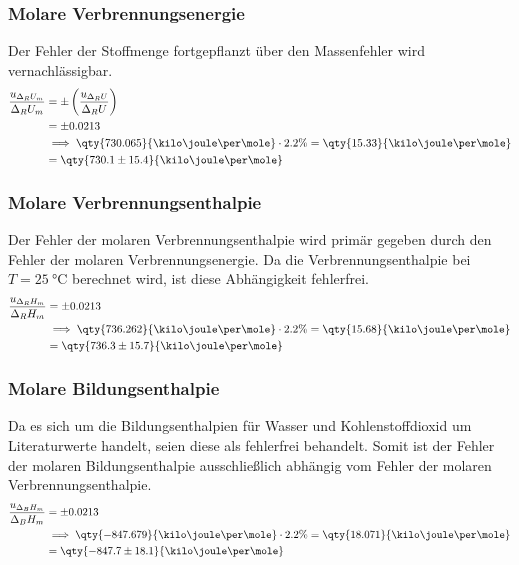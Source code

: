 \subsubsection{Molare Verbrennungsenergie}
Der Fehler der Stoffmenge fortgepflanzt über den Massenfehler wird vernachlässigbar.
\begin{align*}
    \frac{u_{\Delta_R U_m}}{\Delta_R U_m} &= \pm \left( \frac{u_{\Delta_R U}}{\Delta_R U} \right) \\
                                          &= \pm 0.0213 \\
                                          &\implies \qty{730.065}{\kilo\joule\per\mole} \cdot 2.2\% = \qty{15.33}{\kilo\joule\per\mole} \\
                                          &= \qty{730.1 \pm 15.4}{\kilo\joule\per\mole}
\end{align*}
\subsubsection{Molare Verbrennungsenthalpie}
Der Fehler der molaren Verbrennungsenthalpie wird primär gegeben durch den Fehler der molaren Verbrennungsenergie.
Da die Verbrennungsenthalpie bei $T = \qty{25}{\degreeCelsius}$ berechnet wird, ist diese Abhängigkeit fehlerfrei.
\begin{align*}
    \frac{u_{\Delta_R H_m}}{\Delta_R H_m} &= \pm 0.0213 \\
                                          &\implies \qty{736.262}{\kilo\joule\per\mole} \cdot 2.2\% = \qty{15.68}{\kilo\joule\per\mole} \\
                                          &= \qty{736.3 \pm 15.7}{\kilo\joule\per\mole}
\end{align*}

\subsubsection{Molare Bildungsenthalpie}
Da es sich um die Bildungsenthalpien für Wasser und Kohlenstoffdioxid um Literaturwerte handelt, seien diese als fehlerfrei behandelt.
Somit ist der Fehler der molaren Bildungsenthalpie ausschließlich abhängig vom Fehler der molaren Verbrennungsenthalpie.
\begin{align*}
    \frac{u_{\Delta_B H_m}}{\Delta_B H_m} &= \pm 0.0213 \\
                                          &\implies \qty{-847.679}{\kilo\joule\per\mole} \cdot 2.2\% = \qty{18.071}{\kilo\joule\per\mole} \\
                                          &= \qty{-847.7 \pm 18.1}{\kilo\joule\per\mole}
\end{align*}


